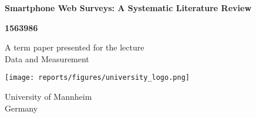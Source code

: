 \documentclass[12pt,a4paper]{article}
\begin{document}
\begin{titlepage}
   \begin{center}
   
       \vspace*{1cm}
       
       \large
       \textbf{Smartphone Web Surveys: A Systematic Literature Review}
        
       \vspace{1.5cm}
   
       \textbf{1563986}
   
       \vfill
   
       A term paper presented for the lecture\\
       Data and Measurement
   
       \vspace{0.8cm}
   
       \texttt{[image: reports/figures/university\_logo.png]}
       
       University of Mannheim\\
       Germany\\
   
       \date{\today}
   
   \end{center}
\end{titlepage}
\end{document}
